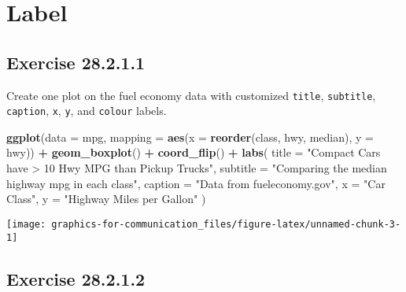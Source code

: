 \documentclass[]{book}
\newenvironment{Shaded}{\begin{snugshade}}{\end{snugshade}}
\newcommand{\DataTypeTok}[1]{\textcolor[rgb]{0.13,0.29,0.53}{#1}}
\newcommand{\KeywordTok}[1]{\textcolor[rgb]{0.13,0.29,0.53}{\textbf{#1}}}
\newcommand{\NormalTok}[1]{#1}
\newcommand{\OperatorTok}[1]{\textcolor[rgb]{0.81,0.36,0.00}{\textbf{#1}}}
\newcommand{\StringTok}[1]{\textcolor[rgb]{0.31,0.60,0.02}{#1}}
\theoremstyle{plain}
\theoremstyle{remark}
\begin{document}
\hypertarget{label}{%
\section{Label}\label{label}}

\hypertarget{exercise-28.2.1.1}{%
\subsection*{\texorpdfstring{Exercise
{28.2.1.1}}{Exercise 28.2.1.1}}\label{exercise-28.2.1.1}}

Create one plot on the fuel economy data with customized \texttt{title},
\texttt{subtitle}, \texttt{caption}, \texttt{x}, \texttt{y}, and
\texttt{colour} labels.

\begin{Shaded}
\begin{Highlighting}[]
\KeywordTok{ggplot}\NormalTok{(}\DataTypeTok{data =}\NormalTok{ mpg,}
       \DataTypeTok{mapping =} \KeywordTok{aes}\NormalTok{(}\DataTypeTok{x =} \KeywordTok{reorder}\NormalTok{(class, hwy, median), }\DataTypeTok{y =}\NormalTok{ hwy)) }\OperatorTok{+}
\StringTok{  }\KeywordTok{geom_boxplot}\NormalTok{() }\OperatorTok{+}
\StringTok{  }\KeywordTok{coord_flip}\NormalTok{() }\OperatorTok{+}
\StringTok{  }\KeywordTok{labs}\NormalTok{(}
    \DataTypeTok{title =} \StringTok{"Compact Cars have > 10 Hwy MPG than Pickup Trucks"}\NormalTok{,}
    \DataTypeTok{subtitle =} \StringTok{"Comparing the median highway mpg in each class"}\NormalTok{,}
    \DataTypeTok{caption =} \StringTok{"Data from fueleconomy.gov"}\NormalTok{,}
    \DataTypeTok{x =} \StringTok{"Car Class"}\NormalTok{,}
    \DataTypeTok{y =} \StringTok{"Highway Miles per Gallon"}
\NormalTok{  )}
\end{Highlighting}
\end{Shaded}

\begin{center}\texttt{[image: graphics-for-communication\_files/figure-latex/unnamed-chunk-3-1]} \end{center}

\hypertarget{exercise-28.2.1.2}{%
\subsection*{\texorpdfstring{Exercise
{28.2.1.2}}{Exercise 28.2.1.2}}\label{exercise-28.2.1.2}}
\end{document}
